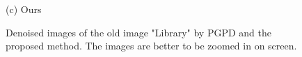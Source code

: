 \documentclass[runningheads]{llncs}
\begin{document}
\begin{figure}
{\begin{minipage}[t]{0.33\textwidth}
{\footnotesize (c) Ours }
\end{minipage}
}
\caption{Denoised images of the old image "Library" by PGPD and the proposed method. The images are better to be zoomed in on screen.}
\label{fig41}
\end{figure}



\end{document}
